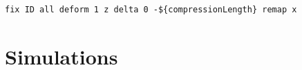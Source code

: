 \documentclass[twoside,english]{uiofysmaster}
\begin{document}
\begin{lstlisting}[caption={LAMMPS command for deforming the simulation box, and remaping atom positions.}, label={lst:Deform}, language=LammpsInput]
fix ID all deform 1 z delta 0 -${compressionLength} remap x
\end{lstlisting}
 

\part{Simulations}
\end{document}
